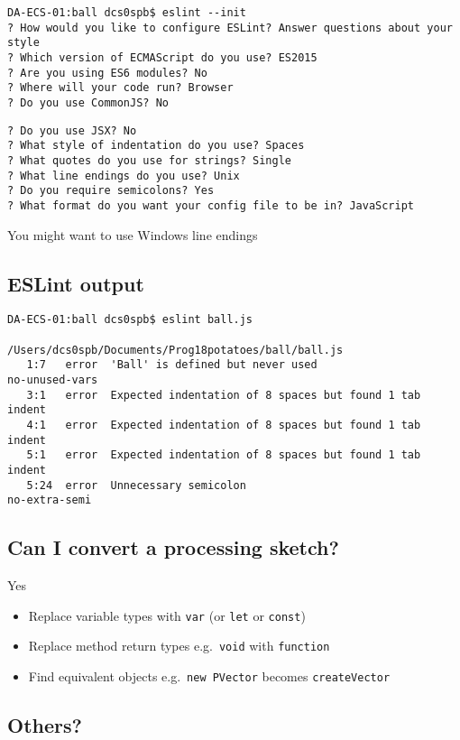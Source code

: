 \documentclass[]{article}
\providecommand{\tightlist}{%
  \setlength{\itemsep}{0pt}\setlength{\parskip}{0pt}}
\begin{document}
\begin{verbatim}
DA-ECS-01:ball dcs0spb$ eslint --init
? How would you like to configure ESLint? Answer questions about your style
? Which version of ECMAScript do you use? ES2015
? Are you using ES6 modules? No
? Where will your code run? Browser
? Do you use CommonJS? No
\end{verbatim}

\begin{verbatim}
? Do you use JSX? No
? What style of indentation do you use? Spaces
? What quotes do you use for strings? Single
? What line endings do you use? Unix
? Do you require semicolons? Yes
? What format do you want your config file to be in? JavaScript
\end{verbatim}

You might want to use Windows line endings

\hypertarget{eslint-output}{%
\subsection{ESLint output}\label{eslint-output}}

\begin{verbatim}
DA-ECS-01:ball dcs0spb$ eslint ball.js

/Users/dcs0spb/Documents/Prog18potatoes/ball/ball.js
   1:7   error  'Ball' is defined but never used                    no-unused-vars
   3:1   error  Expected indentation of 8 spaces but found 1 tab    indent
   4:1   error  Expected indentation of 8 spaces but found 1 tab    indent
   5:1   error  Expected indentation of 8 spaces but found 1 tab    indent
   5:24  error  Unnecessary semicolon                               no-extra-semi
\end{verbatim}

\hypertarget{can-i-convert-a-processing-sketch}{%
\subsection{Can I convert a processing
sketch?}\label{can-i-convert-a-processing-sketch}}

Yes

\begin{itemize}
\tightlist
\item
  Replace variable types with \texttt{var} (or \texttt{let} or
  \texttt{const})
\item
  Replace method return types e.g.~\texttt{void} with \texttt{function}
\item
  Find equivalent objects e.g.~\texttt{new\ PVector} becomes
  \texttt{createVector}
\end{itemize}

\hypertarget{others}{%
\subsection{Others?}\label{others}}
\end{document}
